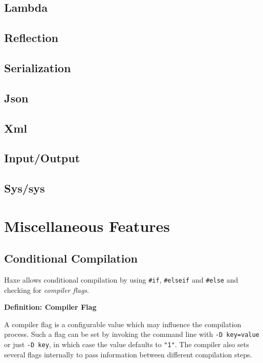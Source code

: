 \documentclass{article}
\newcommand{\expr}[1]{\texttt{#1}}
\newenvironment{myshaded}
  {\def\FrameCommand{\fboxsep=\topsep\colorbox{bgcolor}}%
  \MakeFramed {\advance\hsize-\width \FrameRestore}}%
 {\endMakeFramed}
\newcommand{\define}[3][Definition]
	{\begin{myshaded}\noindent\textbf{#1: #2}\par\nobreak\noindent\ignorespaces#3\label{def:#2}\end{myshaded}}
\begin{document}
\subsection{Lambda}
\label{Lambda}

\subsection{Reflection}
\label{Reflection}

\subsection{Serialization}

\subsection{Json}

\subsection{Xml}

\subsection{Input/Output}

\subsection{Sys/sys}

\section{Miscellaneous Features}
\label{Miscellaneous Features}

\subsection{Conditional Compilation}
\label{Conditional Compilation}

Haxe allows conditional compilation by using \expr{\#if}, \expr{\#elseif} and \expr{\#else} and checking for \emph{compiler flags}.

\define{Compiler Flag}{A compiler flag is a configurable value which may influence the compilation process. Such a flag can be set by invoking the command line with \expr{-D key=value} or just \expr{-D key}, in which case the value defaults to \expr{"1"}. The compiler also sets several flags internally to pass information between different compilation steps.}
\end{document}
